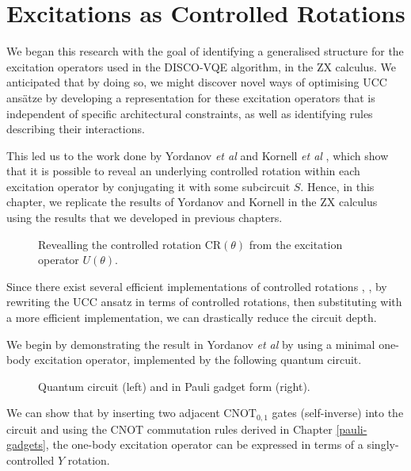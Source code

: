 \section{Excitations as Controlled Rotations}%
\label{operator-controlled-rotations}

We began this research with the goal of identifying a generalised structure for the excitation operators used in the DISCO-VQE algorithm, in the ZX calculus. We anticipated that by doing so, we might discover novel ways of optimising UCC ansätze by developing a representation for these excitation operators that is independent of specific architectural constraints, as well as identifying rules describing their interactions.

This led us to the work done by Yordanov \textit{et al} \cite{Yordanov2020} and Kornell \textit{et al} \cite{Kornell2023}, which show that it is possible to reveal an underlying controlled rotation within each excitation operator by conjugating it with some subcircuit $S$. Hence, in this chapter, we replicate the results of Yordanov and Kornell in the ZX calculus using the results that we developed in previous chapters.

\begin{figure}[H]
    \centering
    \caption{Revealling the controlled rotation CR$(\theta)$ from the excitation operator $U(\theta)$.}
\end{figure}

Since there exist several efficient implementations of controlled rotations \cite{ZomorodiMoghadam2016}, \cite{Ye2006}, by rewriting the UCC ansatz in terms of controlled rotations, then substituting with a more efficient implementation, we can drastically reduce the circuit depth.

We begin by demonstrating the result in Yordanov \textit{et al} by using a minimal one-body excitation operator, implemented by the following quantum circuit.

\begin{figure}[H]
    \centering
    \caption{Quantum circuit (left) and in Pauli gadget form (right).}
    \label{minimal-one-body}
\end{figure}

We can show that by inserting two adjacent $\text{CNOT}_{0, 1}$ gates (self-inverse) into the circuit and using the CNOT commutation rules derived in Chapter \ref{pauli-gadgets}, the one-body excitation operator can be expressed in terms of a singly-controlled $Y$ rotation.


